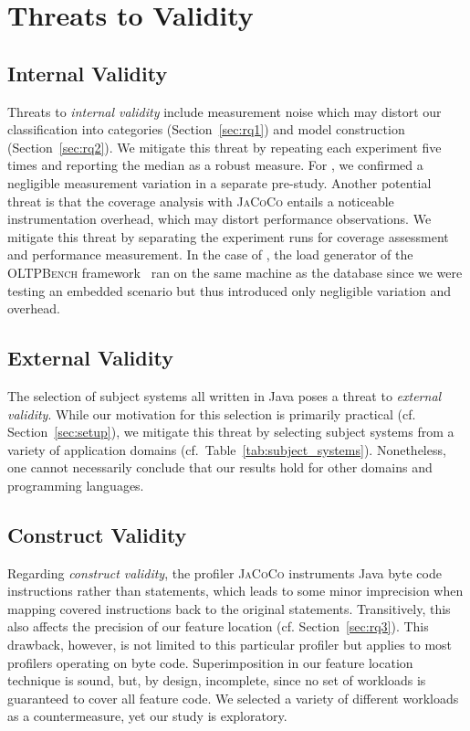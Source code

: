 \section{Threats to Validity}\label{sec:threats}

\subsection{Internal Validity}\label{sec:internal_validity}
Threats to \emph{internal validity} include measurement noise which may distort our classification into categories (Section~\ref{sec:rq1}) and model construction (Section~\ref{sec:rq2}). We mitigate this threat by repeating each experiment five times and reporting the median as a robust measure. For \htwo, we confirmed a negligible measurement variation in a separate pre-study.
Another potential threat is that the coverage analysis with \mbox{\textsc{JaCoCo}} entails a noticeable instrumentation overhead, which may distort performance observations. We mitigate this threat by separating the experiment runs for coverage assessment and performance measurement. In the case of \htwo, the load generator of the \textsc{OLTPBench} framework~\cite{difallah_oltp_2013} ran on the same machine as the database since we were testing an embedded scenario but thus introduced only negligible variation and overhead.

\subsection{External Validity}\label{sec:external_validity}
The selection of subject systems all written in Java poses a threat to \emph{external validity}. While our motivation for this selection is primarily practical (cf. Section~\ref{sec:setup}), we mitigate this threat by selecting subject systems from a variety of application domains (cf.~Table~\ref{tab:subject_systems}). Nonetheless, one cannot necessarily conclude that our results hold for other domains and programming languages. 

\subsection{Construct Validity}\label{sec:construct_validity}
Regarding \emph{construct validity}, the profiler \textsc{JaCoCo} instruments Java byte code instructions rather than statements, which leads to some minor imprecision when mapping covered instructions back to the original statements. Transitively, this also affects the precision of our feature location (cf. Section~\ref{sec:rq3}). This drawback, however, is not limited to this particular profiler but applies to most profilers operating on byte code. 
Superimposition in our feature location technique is sound, but, by design, incomplete, since no set of workloads is guaranteed to cover all feature code. We selected a variety of different workloads as a countermeasure, yet our study is exploratory. 

